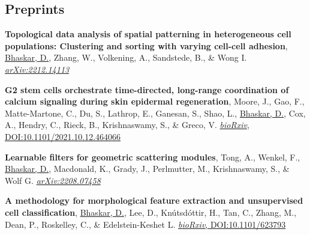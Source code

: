\documentclass[margin,line]{res}
\begin{document}
\begin{resume}
\section{\sc Preprints}
{\renewcommand\leftmargini{0em}
\begin{etaremune}[start=4]
\item{\bf Topological data analysis of spatial patterning in heterogeneous cell populations: Clustering and sorting with varying cell-cell adhesion},
\underline{Bhaskar, D.}, Zhang, W., Volkening, A., Sandstede, B., \& Wong I.
\href{https://arxiv.org/abs/2212.14113}{\textit{arXiv:2212.14113}}
\item{\bf G2 stem cells orchestrate time-directed, long-range coordination of calcium signaling during skin epidermal regeneration},
Moore, J., Gao, F., Matte-Martone, C., Du, S., Lathrop, E., Ganesan, S., Shao, L., \underline{Bhaskar, D.}, Cox, A., Hendry, C., Rieck, B., Krishnaswamy, S., \& Greco, V.
\href{https://doi.org/10.1101/2021.10.12.464066}{\textit{bioRxiv}, DOI:10.1101/2021.10.12.464066}
\item{\bf Learnable filters for geometric scattering modules},
Tong, A., Wenkel, F., \underline{Bhaskar, D.}, Macdonald, K., Grady, J., Perlmutter, M., Krishnaswamy, S., \& Wolf G.
\href{https://arxiv.org/abs/2208.07458}{\textit{arXiv:2208.07458}}
\item{\bf A methodology for morphological feature extraction and unsupervised cell classification},
\underline{Bhaskar, D.}, Lee, D., Kn\'{u}tsd\'{o}ttir, H., Tan, C., Zhang, M., Dean, P., Roskelley, C., \& Edelstein-Keshet L.
\href{https://www.biorxiv.org/content/10.1101/623793v1.abstract}{\textit{bioRxiv}, DOI:10.1101/623793}
\end{etaremune}
}



\end{resume}
\end{document}
